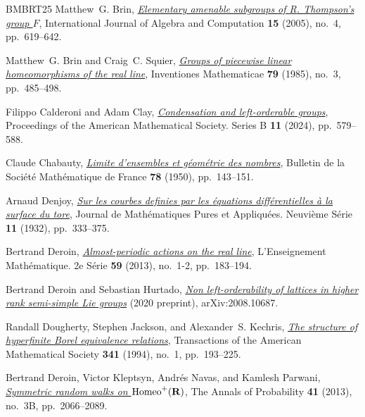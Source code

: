 \documentclass[reqno]{amsart}
\begin{document}
\begin{thebibliography}{BMBRT25}
Matthew~G. Brin, \href{https://doi.org/10.1142/S0218196705002517}{\emph{Elementary amenable subgroups of {R}. {T}hompson's group {$F$}}}, International Journal of Algebra and Computation \textbf{15} (2005), no.~4, pp.~619--642.

Matthew~G. Brin and Craig~C. Squier, \href{https://doi.org/10.1007/BF01388519}{\emph{Groups of piecewise linear homeomorphisms of the real line}}, Inventiones Mathematicae \textbf{79} (1985), no.~3, pp.~485--498.

Filippo Calderoni and Adam Clay, \href{https://doi.org/10.1090/bproc/244}{\emph{Condensation and left-orderable groups}}, Proceedings of the American Mathematical Society. Series B \textbf{11} (2024), pp.~579--588.

Claude Chabauty, \href{http://www.numdam.org/item?id=BSMF_1950__78__143_0}{\emph{Limite d'ensembles et g\'{e}om\'{e}trie des nombres}}, Bulletin de la Soci\'{e}t\'{e} Math\'{e}matique de France \textbf{78} (1950), pp.~143--151.

Arnaud Denjoy, \href{https://eudml.org/doc/234887}{\emph{Sur les courbes definies par les {\'e}quations diff{\'e}rentielles {\`a} la surface du tore}}, Journal de Math{\'e}matiques Pures et Appliqu{\'e}es. Neuvi{\`e}me S{\'e}rie \textbf{11} (1932), pp.~333--375.

Bertrand Deroin, \href{https://doi.org/10.4171/LEM/59-1-7}{\emph{Almost-periodic actions on the real line}}, L'Enseignement Math\'{e}matique. 2e S\'{e}rie \textbf{59} (2013), no.~1-2, pp.~183--194.

Bertrand Deroin and Sebastian Hurtado, \href{http://arxiv.org/abs/2008.10687}{\emph{Non left-orderability of lattices in higher rank semi-simple {L}ie groups}} (2020 preprint), arXiv:2008.10687.

Randall Dougherty, Stephen Jackson, and Alexander~S. Kechris, \href{https://doi.org/10.2307/2154620}{\emph{The structure of hyperfinite {B}orel equivalence relations}}, Transactions of the American Mathematical Society \textbf{341} (1994), no.~1, pp.~193--225.

Bertrand Deroin, Victor Kleptsyn, Andr\'{e}s Navas, and Kamlesh Parwani, \href{https://doi.org/10.1214/12-AOP784}{\emph{Symmetric random walks on {${\rm Homeo}^+({\bf R})$}}}, The Annals of Probability \textbf{41} (2013), no.~3B, pp.~2066--2089.


\end{thebibliography}
\end{document}
